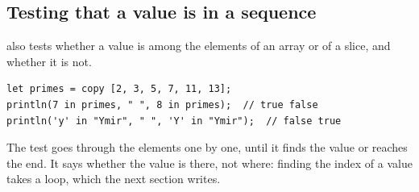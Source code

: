 \subsection{Testing that a value is in a sequence}

 also tests whether a value is among the elements of an array or of a
slice, and  whether it is not.

\begin{lstlisting}[style=coloredverbatim]
let primes = copy [2, 3, 5, 7, 11, 13];
println(7 in primes, " ", 8 in primes);  // true false
println('y' in "Ymir", " ", 'Y' in "Ymir");  // false true
\end{lstlisting}

The test goes through the elements one by one, until it finds the value or
reaches the end. It says whether the value is there, not where: finding the
index of a value takes a loop, which the next section writes.
